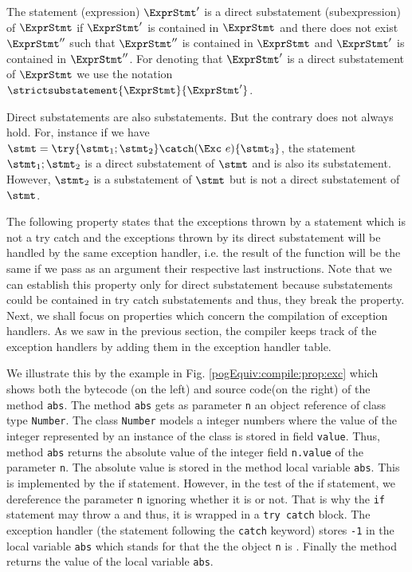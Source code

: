 \begin{seqInstr} \label{pogCompile:compile:prop:direct}
 The statement (expression) $\ExprStmt'$ is a direct substatement (subexpression) of  $\ExprStmt$
if $\ExprStmt'$  is contained in $\ExprStmt$ 
and there does not exist  $\ExprStmt''$  such that  $\ExprStmt''$ is contained in   $\ExprStmt$ and  $\ExprStmt'$ is contained in  $\ExprStmt''$.
For denoting that  $\ExprStmt'$ is a direct substatement of  $\ExprStmt$
we use the notation $\strictsubstatement{\ExprStmt }{\ExprStmt'}$.
\end{seqInstr}
Direct substatements are also substatements. But the contrary does not always hold. 
For, instance if we have $\stmt = \try \{ \stmt_1;\stmt_2 \} \catch ( \Exc \ e ) \{ \stmt_3\} $,
 the statement $\stmt_1;\stmt_2  $ is a direct substatement of $\stmt$ and is also its substatement. However,   $\stmt_2  $ is a substatement of    $\stmt$
but is not a direct substatement of $\stmt$.

The following property states that the exceptions thrown by a 
statement which is not a try catch and the  exceptions thrown by its direct substatement
will be handled by the same exception handler, i.e. the result of the function \findExcHandlerOnly{} will be the same 
if we pass as an argument their respective last instructions. Note that we can establish this property only
for direct substatement because  substatements could be contained in try catch substatements and
 thus, they   break the property.
Next, we shall focus on properties which concern the compilation of exception handlers. 
As we saw in the previous section, the compiler keeps track of the exception 
handlers by adding them in the exception handler table. 

We illustrate this by the example in Fig. \ref{pogEquiv:compile:prop:exc} which shows both the bytecode (on the left) and source code(on the right)
 of the method \lstinline!abs!.
The method \lstinline!abs! gets as parameter \lstinline!n! an object reference of class type  \lstinline!Number!. The class  \lstinline!Number!
models a integer numbers where the value of the integer represented by an instance of the class is stored in field \lstinline!value!. 
 Thus, method  \lstinline!abs! returns  the absolute value of the integer field \lstinline!n.value! of the parameter \lstinline!n!. The absolute value is stored
in the method local variable \lstinline!abs!. This is implemented by the if statement. However, in the test of the if statement, we dereference
 the parameter  \lstinline!n! ignoring whether it is \Mynull{} or not. That is why the \lstinline!if! statement may throw a \NullPointerExc{} and thus,
 it is wrapped in a \lstinline!try catch! block. 
The exception handler (the statement following the \lstinline!catch! keyword)
stores \lstinline!-1! in the local variable \lstinline!abs! which stands for that the 
the object  \lstinline!n! is \Mynull.   
Finally the method returns the value of the local variable \lstinline!abs!.

